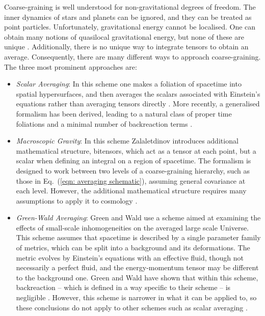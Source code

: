 \documentclass[a4paper,12pt]{report}
\renewcommand{\eqref}[1]{Eq.~({#1})}
\begin{document}
Coarse-graining is well understood for non-gravitational degrees of freedom. The inner dynamics of stars and planets can be ignored, and they can be treated as point particles. Unfortunately, gravitational energy cannot be localised. One can obtain many notions of quasilocal gravitational energy, but none of these are unique \cite{RN205}. Additionally, there is no unique way to integrate tensors to obtain an average. Consequently, there are many different ways to approach coarse-graining. The three most prominent approaches are:
\begin{itemize}
    \item \textit{Scalar Averaging}: In this scheme one makes a foliation of spacetime into spatial hypersurfaces, and then averages the scalars associated with Einstein's equations rather than averaging tensors directly \cite{RN207,RN208}. More recently, a generalised formalism has been derived, leading to a natural class of proper time foliations and a minimal number of backreaction terms \cite{RN206}.
    \item \textit{Macroscopic Gravity}: In this scheme Zalaletdinov \cite{RN211,RN209,RN210} introduces additional mathematical structure, bitensors, which act as a tensor at each point, but a scalar when defining an integral on a region of spacetime. The formalism is designed to work between two levels of a coarse-graining hierarchy, such as those in \eqref{\ref{eqn: averaging schematic}}, assuming general covariance at each level. However, the additional mathematical structure requires many assumptions to apply it to cosmology \cite{RN212,RN213,RN214,RN215}.
    \item \textit{Green-Wald Averaging}: Green and Wald \cite{RN216} use a scheme aimed at examining the effects of small-scale inhomogeneities on the averaged large scale Universe. This scheme assumes that spacetime is described by a single parameter family of metrics, which can be split into a background and its deformations. The metric evolves by Einstein's equations with an effective fluid, though not necessarily a perfect fluid, and the energy-momentum tensor may be different to the background one. Green and Wald have shown that within this scheme, backreaction -- which is defined in a way specific to their scheme -- is negligible \cite{RN216,RN217,RN218}. However, this scheme is narrower in what it can be applied to, so these conclusions do not apply to other schemes such as scalar averaging \cite{RN153,RN219}.
\end{itemize}
\end{document}
